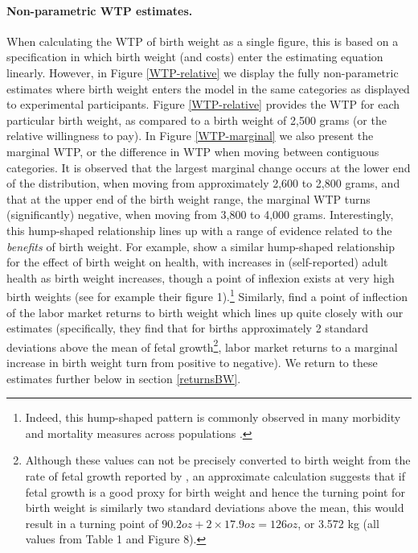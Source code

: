 \documentclass[a4paper, 11pt]{article}
\begin{document}
\begin{spacing}{1.4}
\paragraph{Non-parametric WTP estimates.} When calculating the WTP of birth weight as a single figure, this is
based on a specification in which birth weight (and costs) enter the
estimating equation linearly.  However, in Figure \ref{WTP-relative} we
display the fully non-parametric estimates where birth weight enters
the model in the same categories as displayed to experimental participants.
Figure \ref{WTP-relative} provides the WTP for each particular birth
weight, as compared to a birth weight of 2,500 grams (or the relative
willingness to pay).  In Figure \ref{WTP-marginal} we also present the
marginal WTP, or the difference in WTP when moving between contiguous
categories.  It is observed that the largest marginal change occurs
at the lower end of the distribution, when moving from approximately
2,600 to 2,800 grams, and that at the upper end of the birth weight
range, the marginal WTP turns (significantly) negative, when moving
from 3,800 to 4,000 grams.  Interestingly, this hump-shaped relationship
lines up with a range of evidence related to the \emph{benefits} of
birth weight.  For example, \citet{Caseetal2005} show a similar
hump-shaped relationship for the effect of birth weight on health,
with increases in (self-reported) adult health as birth weight
increases, though a point of inflexion exists at very high birth weights
(see for example their figure 1).\footnote{Indeed, this hump-shaped pattern is commonly observed in many morbidity and
  mortality measures across populations \citep{Wilcox2001}.} Similarly,
\citet{BehrmanRosenzweig2004}
find a point of inflection of the labor market returns to birth weight
which lines up quite closely with our estimates (specifically, they
find that for births approximately 2 standard deviations above the mean
of fetal growth\footnote{Although these values can not be precisely
  converted to birth weight from the rate of fetal growth reported by
  \citet{BehrmanRosenzweig2004}, an approximate calculation suggests
  that if fetal growth is a good proxy for birth weight and hence the
  turning point for birth weight is similarly two standard deviations
  above the mean, this would result in a turning point of
  $90.2 oz + 2\times 17.9 oz = 126 oz$, or 3.572 kg (all values from
  \citet{BehrmanRosenzweig2004} Table 1 and Figure 8).}, labor market
returns to a marginal increase in birth weight turn from positive to
negative). We return to these estimates further below in section
\ref{returnsBW}.


\end{spacing}
\end{document}
